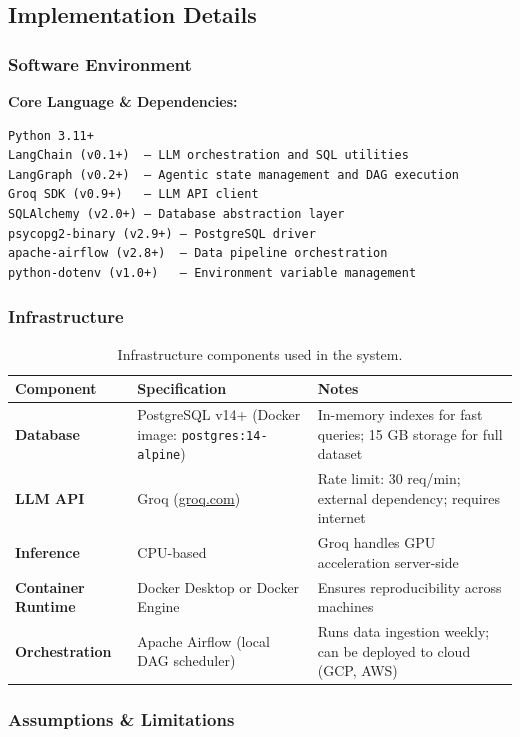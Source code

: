 \documentclass{article}
\begin{document}
\subsection{Implementation Details}

\subsubsection{Software Environment}
\textbf{Core Language \& Dependencies:}

\begin{verbatim}
Python 3.11+
LangChain (v0.1+)  — LLM orchestration and SQL utilities
LangGraph (v0.2+)  — Agentic state management and DAG execution
Groq SDK (v0.9+)   — LLM API client
SQLAlchemy (v2.0+) — Database abstraction layer
psycopg2-binary (v2.9+) — PostgreSQL driver
apache-airflow (v2.8+)  — Data pipeline orchestration
python-dotenv (v1.0+)   — Environment variable management
\end{verbatim}

\subsubsection{Infrastructure}
\begin{table}[H]
\centering
\small
\begin{tabularx}{\textwidth}{|l|X|X|}
\hline
\textbf{Component} & \textbf{Specification} & \textbf{Notes} \\
\hline
\textbf{Database} & PostgreSQL v14+ (Docker image: \texttt{postgres:14-alpine}) & In-memory indexes for fast queries; 15 GB storage for full dataset \\
\hline
\textbf{LLM API} & Groq (\href{http://groq.com}{groq.com}) & Rate limit: 30 req/min; external dependency; requires internet \\
\hline
\textbf{Inference} & CPU-based & Groq handles GPU acceleration server-side \\
\hline
\textbf{Container Runtime} & Docker Desktop or Docker Engine & Ensures reproducibility across machines \\
\hline
\textbf{Orchestration} & Apache Airflow (local DAG scheduler) & Runs data ingestion weekly; can be deployed to cloud (GCP, AWS) \\
\hline
\end{tabularx}
\caption{Infrastructure components used in the system.}
\label{tab:infrastructure}
\end{table}

\subsubsection{Assumptions \& Limitations}
\end{document}
